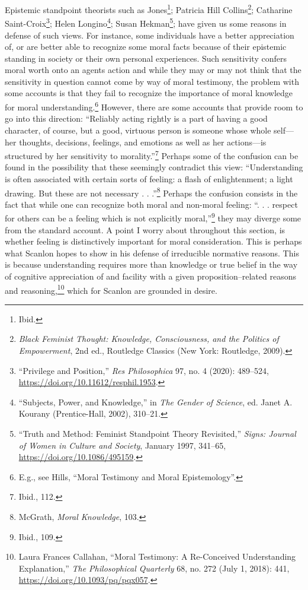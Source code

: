 \documentclass[phdthesis,12pt,final,a4paper]{wuthesis}
\theoremstyle{definition}
\theoremstyle{definition}
\theoremstyle{definition}
\theoremstyle{definition}
\theoremstyle{remark}
\begin{document}
Epistemic standpoint theorists such as Jones\footnote{Ibid.}; Patricia Hill Collins\footnote{\emph{Black Feminist Thought: Knowledge, Consciousness, and the Politics of Empowerment}, 2nd ed., Routledge Classics (New York: Routledge, 2009).}; Catharine Saint-Croix\footnote{{``Privilege and {Position},''} \emph{Res Philosophica} 97, no. 4 (2020): 489--524, \url{https://doi.org/10.11612/resphil.1953}.}; Helen Longino\footnote{{``Subjects, {Power}, and {Knowledge},''} in \emph{The {Gender} of {Science}}, ed. Janet A. Kourany (Prentice-Hall, 2002), 310--21.}; Susan Hekman\footnote{{``Truth and Method: {Feminist} Standpoint Theory Revisited,''} \emph{Signs: Journal of Women in Culture and Society}, January 1997, 341--65, \url{https://doi.org/10.1086/495159}.}; have given us some reasons in defense of such views. For instance, some individuals have a better appreciation of, or are better able to recognize some moral facts because of their epistemic standing in society or their own personal experiences. Such sensitivity confers moral worth onto an agent\textquotesingle s action and while they may or may not think that the sensitivity in question cannot come by way of moral testimony, the problem with some accounts is that they fail to recognize the importance of moral knowledge for moral understanding.\footnote{E.g., see Hills, {``Moral Testimony and Moral Epistemology''}.} However, there are some accounts that provide room to go into this direction: ``Reliably acting rightly is a part of having a good character, of course, but a good, virtuous person is someone whose whole self---her thoughts, decisions, feelings, and emotions as well as her actions---is structured by her sensitivity to morality.''\footnote{Ibid., 112.} Perhaps some of the confusion can be found in the possibility that these seemingly contradict this view: ``Understanding is often associated with certain sorts of feeling: a flash of enlightenment; a light drawing. But these are not necessary . . .''\footnote{McGrath, \emph{Moral {Knowledge}}, 103.} Perhaps the confusion consists in the fact that while one can recognize both moral and non-moral feeling: ``. . . respect for others can be a feeling which is not explicitly moral,''\footnote{Ibid., 109.} they may diverge some from the standard account. A point I worry about throughout this section, is whether feeling is distinctively important for moral consideration. This is perhaps what Scanlon hopes to show in his defense of irreducible normative reasons. This is because understanding requires more than knowledge or true belief in the way of cognitive appreciation of and facility with a given proposition--related reasons and reasoning,\footnote{Laura Frances Callahan, {``Moral {Testimony}: {A Re-Conceived Understanding Explanation},''} \emph{The Philosophical Quarterly} 68, no. 272 (July 1, 2018): 441, \url{https://doi.org/10.1093/pq/pqx057}.} which for Scanlon are grounded in desire.
\end{document}
